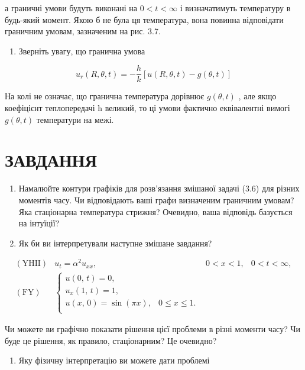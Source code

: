 \documentclass[
  ukrainian,
]{article}
\providecommand{\tightlist}{%
  \setlength{\itemsep}{0pt}\setlength{\parskip}{0pt}}
\begin{document}
а граничні умови будуть виконані на \(0 < t < \infty\) і визначатимуть
температуру в будь-який момент. Якою б не була ця температура, вона
повинна відповідати граничним умовам, зазначеним на рис. 3.7.

\begin{enumerate}
\def\labelenumi{\arabic{enumi}.}
\setcounter{enumi}{1}
\tightlist
\item
  Зверніть увагу, що гранична умова
\end{enumerate}

\[
u_r(R, \theta, t) = -\frac{h}{k} [u(R, \theta, t) - g(\theta, t)]
\]

На колі не означає, що гранична температура дорівнює \(g(\theta,t)\) ,
але якщо коефіцієнт теплопередачі h великий, то ці умови фактично
еквівалентні вимогі \(g(\theta,t)\) температури на межі.

\section{ЗАВДАННЯ}\label{ux437ux430ux432ux434ux430ux43dux43dux44f-1}

\begin{enumerate}
\def\labelenumi{\arabic{enumi}.}
\item
  Намалюйте контури графіків для розв'язання змішаної задачі (3.6) для
  різних моментів часу. Чи відповідають ваші графи визначеним граничним
  умовам? Яка стаціонарна температура стрижня? Очевидно, ваша відповідь
  базується на інтуїції?
\item
  Як би ви інтерпретували наступне змішане завдання?
\end{enumerate}

\[
\begin{array}{lll} (\text{YHII}) & u_t = \alpha^2 u_{xx}, & 0 < x < 1, & 0 < t < \infty, \\ (\text{FY}) & \begin{cases} u\left(0,\,t\right) = 0, \\ u_x\left(1,\,t\right) = 1, \\ u\left(x,\,0\right) = \sin\left(\pi x\right), & 0 \leqslant x \leqslant 1. \\ \end{cases} \end{array}
\]

Чи можете ви графічно показати рішення цієї проблеми в різні моменти
часу? Чи буде це рішення, як правило, стаціонарним? Це очевидно?

\begin{enumerate}
\def\labelenumi{\arabic{enumi}.}
\setcounter{enumi}{2}
\tightlist
\item
  Яку фізичну інтерпретацію ви можете дати проблемі
\end{enumerate}
\end{document}
